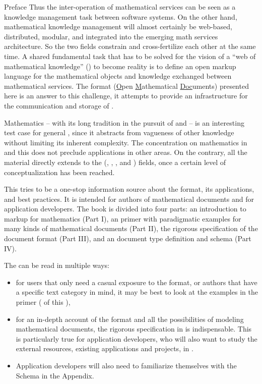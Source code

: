 \begin{omgroup}[display=flow]{Preface}
Thus the inter-operation of mathematical services can be seen as a knowledge management
task between software systems. On the other hand, mathematical knowledge management will
almost certainly be web-based, distributed, modular, and integrated into the emerging math
services architecture. So the two fields constrain and cross-fertilize each other at the
same time.  A shared fundamental task that has to be solved for the vision of a ``web of
mathematical knowledge'' ({\mathweb}) to become reality is to define an open markup
language for the mathematical objects and knowledge exchanged between mathematical
services.  The {\omdoc} format (\underline{O}pen \underline{M}athematical
\underline{Doc}uments) presented here is an answer to this challenge, it attempts to
provide an infrastructure for the communication and storage of
{}.

Mathematics -- with its long tradition in the pursuit of {}
and {} -- is an interesting test case for general
{}, since it abstracts from vagueness of other knowledge
without limiting its inherent complexity. The concentration on mathematics in {\omdoc} and
this {\report} does not preclude applications in other areas. On the contrary, all the
material directly extends to the {} ({},
{}, {}, and {}) fields,
once a certain level of conceptualization has been reached.

This {\report} tries to be a one-stop information source about the {\omdoc} format, its
applications, and best practices. It is intended for authors of mathematical documents and
for application developers. The book is divided into four parts: an introduction to markup for
mathematics (Part I), an {\omdoc} primer with paradigmatic examples for many kinds of
mathematical documents (Part II), the rigorous specification of the {\omdoc} document
format (Part III), and an {\xml} document type definition and schema (Part IV).

The {\report} can be read in multiple ways: 
\begin{itemize}
\item for users that only need a casual exposure to the format, or authors that
  have a specific text category in mind, it may be best to look at the examples in
  the {\omdoc} primer ({} of this {\report}), 
\item for an in-depth account of the format and all the possibilities of modeling
  mathematical documents, the rigorous specification in
  {} is indispensable.  This is particularly true for
  application developers, who will also want to study the external resources,
  existing {\omdoc} applications and projects, in {}.
\item Application developers will also need to familiarize themselves with the {\omdoc}
  Schema in the Appendix.
\end{itemize}
\end{omgroup}


